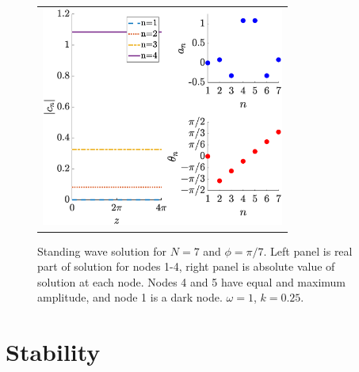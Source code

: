 \documentclass[reprint, amsmath,amssymb,aps,pra]{revtex4-2}
\begin{document}
\begin{figure}
\begin{center}
\begin{tabular}{c}
\includegraphics[width=8cm]{oddhole7.eps}
\end{tabular}
\end{center}
\caption{Standing wave solution for $N = 7$ and $\phi = \pi/7$. Left panel is real part of solution for nodes 1-4, right panel is absolute value of solution at each node. Nodes 4 and 5 have equal and maximum amplitude, and node 1 is a dark node. $\omega = 1$, $k = 0.25$.}
\label{fig:oddhole7}
\end{figure}

\section{Stability}\label{sec:stability}
\end{document}
